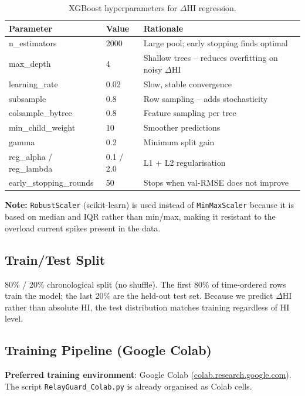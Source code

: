 \documentclass[12pt,a4paper]{article}
\newenvironment{notebox}{%
  \begin{mdframed}[backgroundcolor=notebg,linecolor=noteln,linewidth=1.5pt,
    innerleftmargin=9pt,innerrightmargin=9pt,innertopmargin=5pt,innerbottommargin=5pt]
  \textbf{\color{noteln}Note: }}{\end{mdframed}}
\begin{document}
\begin{table}[H]
\centering
\begin{tabular}{lll}
\toprule
\textbf{Parameter} & \textbf{Value} & \textbf{Rationale} \\
\midrule
n\_estimators           & 2000   & Large pool; early stopping finds optimal \\
max\_depth              & 4      & Shallow trees -- reduces overfitting on noisy $\Delta$HI \\
learning\_rate          & 0.02   & Slow, stable convergence \\
subsample               & 0.8    & Row sampling -- adds stochasticity \\
colsample\_bytree       & 0.8    & Feature sampling per tree \\
min\_child\_weight      & 10     & Smoother predictions \\
gamma                   & 0.2    & Minimum split gain \\
reg\_alpha / reg\_lambda & 0.1 / 2.0 & L1 + L2 regularisation \\
early\_stopping\_rounds & 50     & Stops when val-RMSE does not improve \\
\bottomrule
\end{tabular}
\caption{XGBoost hyperparameters for $\Delta$HI regression.}
\end{table}

\begin{notebox}
\texttt{RobustScaler} (scikit-learn) is used instead of \texttt{MinMaxScaler} because it is based on
median and IQR rather than min/max, making it resistant to the overload current spikes present in the data.
\end{notebox}

\subsection{Train/Test Split}

80\% / 20\% chronological split (no shuffle). The first 80\% of time-ordered rows train the model; the last
20\% are the held-out test set. Because we predict $\Delta$HI rather than absolute HI, the test distribution
matches training regardless of HI level.

\subsection{Training Pipeline (Google Colab)}

\textbf{Preferred training environment}: Google Colab (\href{https://colab.research.google.com}{colab.research.google.com}). The script \texttt{RelayGuard\_Colab.py} is already organised as Colab cells.
\end{document}
